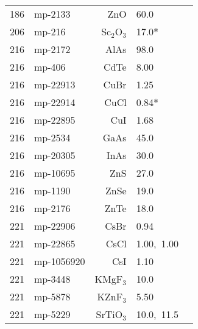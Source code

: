 \begin{table*}[ht]
\begin{center}
\begin{tabular}{rlrll}
     186 &     mp-2133 &           ZnO &            60.0 &     \cite{Morelli.2006} \\    
     206 &      mp-216 &   Sc$_2$O$_3$ &            17.0* &          \cite{Li.2003} \\
     216 &     mp-2172 &          AlAs &            98.0 &     \cite{Morelli.2006} \\
     216 &      mp-406 &          CdTe &            8.00 &          \cite{Su.2015} \\
     216 &    mp-22913 &          CuBr &            1.25 &       \cite{perry2016} \\
     216 &    mp-22914 &          CuCl &            0.84* &       \cite{Slack.1982} \\
     216 &    mp-22895 &           CuI &            1.68 &       \cite{perry2016} \\
     216 &     mp-2534 &          GaAs &            45.0 &     \cite{Morelli.2006} \\
     216 &    mp-20305 &          InAs &            30.0 &     \cite{Morelli.2006} \\
     216 &    mp-10695 &           ZnS &            27.0 &     \cite{Morelli.2006} \\
     216 &     mp-1190 &          ZnSe &            19.0 &     \cite{Morelli.2006} \\
     216 &     mp-2176 &          ZnTe &            18.0 &     \cite{Morelli.2006} \\
     221 &    mp-22906 &          CsBr &            0.94 &     \cite{Gerlich.1982} \\
     221 &    mp-22865 &          CsCl &            1.00,~1.00 &     \cite{Gerlich.1982,Sist.2017} \\
     221 &  mp-1056920 &           CsI &            1.10 &     \cite{Gerlich.1982} \\
     221 &     mp-3448 &      KMgF$_3$ &            10.0 &      \cite{Martin.1976} \\
     221 &     mp-5878 &      KZnF$_3$ &            5.50 &     \cite{Suemune.1964} \\
     221 &     mp-5229 &     SrTiO$_3$ &            10.0,~11.5 &      \cite{Popuri.2014,Muta.2005} \\

\end{tabular}
\end{center}
\end{table*}
